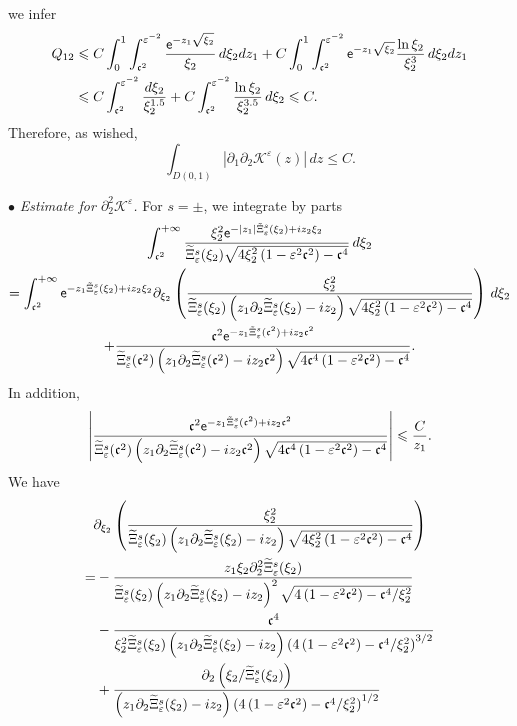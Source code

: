 \documentclass[AHL,Unicode,longabstracts,published]{cedram}
\newcommand*\p{\partial}
\newcommand*\BK{\mathcal{K}}
\newcommand*\ex{{\sf e}}
\newcommand*\cs{{\mathfrak c}}
\newcommand*\ii{\infty}
\newcommand*\ls{\leqslant }
\newcommand*\e{\varepsilon}
\renewcommand*\t{\tilde}
\let\oldtilde\tilde
\renewcommand*{\tilde}[1]{\mathchoice{\widetilde{#1}}{\widetilde{#1}}{\oldtilde{#1}}{\oldtilde{#1}}}
\begin{document}
we infer
\begin{align*}
Q_{12} & \ls C \int_{0}^1 \int_{\cs^2}^{\e^{-2}} \frac{ \ex^{ - z_1 \sqrt{\xi_2 } } }{ \xi_2 } \, d\xi_2 dz_1 + C \int_{0}^1 \int_{\cs^2}^{\e^{-2}} \ex^{ - z_1 \sqrt{\xi_2 } } \frac{\ln \xi_2}{\xi_2^3} \, d\xi_2 dz_1
\\ & \ls C \int_{\cs^2}^{\e^{-2}} \frac{ d\xi_2 }{ \xi_2^{1.5} } + C \int_{\cs^2}^{\e^{-2}} \frac{\ln \xi_2}{\xi_2^{3.5}} \, d\xi_2
\ls C.
\end{align*}
Therefore, as wished,
\[
\int_{D(0,1)} \left\lvert \p_1 \p_2 \BK^\e (z) \right\rvert \, dz \ls C.
\]


\noindent $ \bullet $ \emph{Estimate for $ \p_2^2 \BK^\e $.} For $ s = \pm $, we integrate by parts
\begin{multline}\label{IPP_K22_zero}
\int_{ \cs^2}^{+\ii} \frac{ \xi_2^2 \ex^{- |z_1| \t\Xi_\e^s (\xi_2) + i z_2 \xi_2} }{
\t\Xi_\e^s (\xi_2) \sqrt{ 4 \xi_2^2 \left(1 - \e^2 \cs^2\right) - \cs^4}} \, d\xi_2\\  =
\int_{ \cs^2}^{+\ii} \ex^{- z_1 \t\Xi_\e^s (\xi_2) + i z_2 \xi_2 }
\p_{\xi_2} \left(\frac{ \xi_2^2 }{ \t\Xi_\e^s (\xi_2) \left(z_1 \p_2 \t\Xi_\e^s (\xi_2) - i z_2\right) \sqrt{ 4 \xi_2^2 \left(1 - \e^2 \cs^2\right) - \cs^4 } } \right) \, d\xi_2 \\
+ \frac{ \cs^2 \ex^{- z_1 \t\Xi_\e^s (\cs^2) + i z_2 \cs^2 } }{ \t\Xi_\e^s (\cs^2) \left(z_1 \p_2 \t\Xi_\e^s (\cs^2) - i z_2 \cs^2\right) \sqrt{ 4 \cs^4 \left(1 - \e^2 \cs^2\right) - \cs^4 } }.
\end{multline}
In addition,
\[
\left\lvert
\frac{ \cs^2 \ex^{- z_1 \t\Xi_\e^s (\cs^2) + i z_2 \cs^2} }{ \t\Xi_\e^s (\cs^2) \left(z_1 \p_2 \t\Xi_\e^s (\cs^2) - i z_2 \cs^2\right)
\sqrt{ 4 \cs^4 \left(1 - \e^2 \cs^2\right) - \cs^4 } } \right\rvert
\ls \frac{C}{z_1 }.
\]
We have
\begin{multline*}
\p_{\xi_2} \left(\frac{ \xi_2^2 }{ \t\Xi_\e^s (\xi_2) \left(z_1 \p_2 \t\Xi_\e^s (\xi_2) - i z_2\right) \sqrt{ 4 \xi_2^2 \left(1 - \e^2 \cs^2\right) - \cs^4 } } \right)\\ 
\begin{aligned}
 =& - \frac{ z_1 \xi_2 \p_2^2 \t\Xi_\e^s (\xi_2) }{ \t\Xi_\e^s (\xi_2) \left(z_1 \p_2 \t\Xi_\e^s (\xi_2) - i z_2\right)^2 \sqrt{ 4 \left(1 - \e^2 \cs^2\right) - \cs^4 / \xi_2^2} }\\
&- \frac{ \cs^4 }{ \xi_2^2 \t\Xi_\e^s (\xi_2) \left(z_1 \p_2 \t\Xi_\e^s (\xi_2) - i z_2\right) \left(4 \left(1 - \e^2 \cs^2\right) - \cs^4 /\xi_2^2\right)^{3/2} }\\ 
&+ \frac{ \p_2 \left(\xi_2 / \t\Xi_\e^s (\xi_2)\right) }{\left(z_1 \p_2 \t\Xi_\e^s (\xi_2) - i z_2\right) \left(4 \left(1 - \e^2 \cs^2\right) - \cs^4 /\xi_2^2\right)^{1/2} }
\end{aligned}
\end{multline*}
\end{document}
